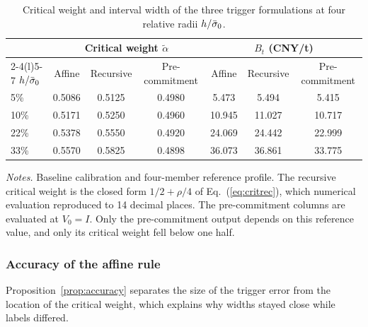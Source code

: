 \begin{table}[!t]
\caption{Critical weight and interval width of the three trigger formulations at four relative radii $h/\bar{\sigma}_0$.}
\label{tab:threeform}
\centering
\footnotesize
\begin{tabular}{@{}lcccccc@{}}
\toprule
 & \multicolumn{3}{c}{Critical weight $\tilde{\alpha}$} & \multicolumn{3}{c}{$B_t$ (CNY/t)}\\
\cmidrule(lr){2-4}\cmidrule(l){5-7}
$h/\bar{\sigma}_0$ & Affine & Recursive & Pre-commitment & Affine & Recursive & Pre-commitment\\
\midrule
5\% & 0.5086 & 0.5125 & 0.4980 & 5.473 & 5.494 & 5.415\\
10\% & 0.5171 & 0.5250 & 0.4960 & 10.945 & 11.027 & 10.717\\
22\% & 0.5378 & 0.5550 & 0.4920 & 24.069 & 24.442 & 22.999\\
33\% & 0.5570 & 0.5825 & 0.4898 & 36.073 & 36.861 & 33.775\\
\bottomrule
\end{tabular}
\par\smallskip
\parbox{0.95\textwidth}{\footnotesize\emph{Notes.} Baseline calibration and four-member reference profile. The recursive critical weight is the closed form $1/2+\rho/4$ of Eq.~(\ref{eq:critrec}), which numerical evaluation reproduced to 14 decimal places. The pre-commitment columns are evaluated at $V_0=I$. Only the pre-commitment output depends on this reference value, and only its critical weight fell below one half.}
\end{table}

\subsubsection{Accuracy of the affine rule}

Proposition~\ref{prop:accuracy} separates the size of the trigger error from the location of the critical weight, which explains why widths stayed close while labels differed.

